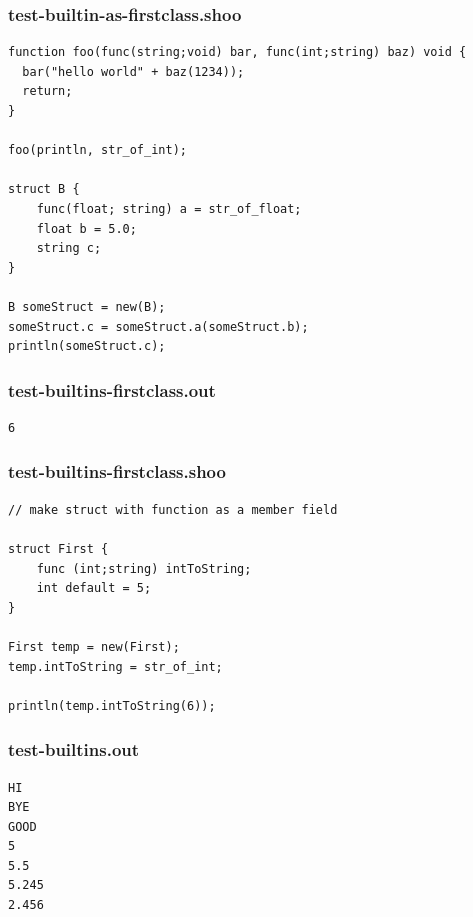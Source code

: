 \documentclass[12pt]{article}
\begin{document}
\subsubsection{test-builtin-as-firstclass.shoo}
\begin{mdframed}[hidealllines=true,backgroundcolor=blue!10]
\begin{lstlisting}
function foo(func(string;void) bar, func(int;string) baz) void {
  bar("hello world" + baz(1234));
  return;
}

foo(println, str_of_int);

struct B {
    func(float; string) a = str_of_float;
    float b = 5.0;
    string c;
}

B someStruct = new(B);
someStruct.c = someStruct.a(someStruct.b);
println(someStruct.c);

\end{lstlisting}
\end{mdframed}
\subsubsection{test-builtins-firstclass.out}
\begin{mdframed}[hidealllines=true,backgroundcolor=green!10]
\begin{lstlisting}
6\end{lstlisting}
\end{mdframed}
\subsubsection{test-builtins-firstclass.shoo}
\begin{mdframed}[hidealllines=true,backgroundcolor=blue!10]
\begin{lstlisting}
// make struct with function as a member field

struct First {
	func (int;string) intToString;
	int default = 5;
}

First temp = new(First);
temp.intToString = str_of_int;

println(temp.intToString(6));\end{lstlisting}
\end{mdframed}
\subsubsection{test-builtins.out}
\begin{mdframed}[hidealllines=true,backgroundcolor=green!10]
\begin{lstlisting}
HI
BYE
GOOD
5
5.5
5.245
2.456\end{lstlisting}
\end{mdframed}
\end{document}
